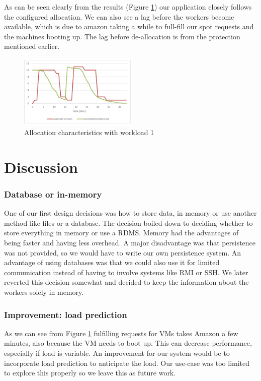 \documentclass[a4paper]{IEEEtran}
\begin{document}
As can be seen clearly from the results (Figure \ref{fig_allperfresults}) our application closely follows the configured allocation. We can also see a lag before the workers become available, which is due to amazon taking a while to full-fill our spot requests and the machines booting up. The lag before de-allocation is from the protection mentioned earlier.

\begin{figure}
\centering
\includegraphics[width=0.5\textwidth]{"results-allocation-2"}
\caption{Allocation characteristics with workload 1}
\label{fig_allperfresults}
\end{figure}
 
\newpage
\section{Discussion}


\subsubsection*{Database or in-memory}

One of our first design decisions was how to store data, in memory or use another method like files or a database. The decision boiled down to deciding whether to store everything in memory or use a RDMS. Memory had the advantages of being faster and having less overhead. A major disadvantage was that persistence was not provided, so we would have to write our own persistence system. An advantage of using databases was that we could also use it for limited communication instead of having to involve systems like RMI or SSH. We later reverted this decision somewhat and decided to keep the information about the workers solely in memory.

\subsubsection*{Improvement: load prediction}

As we can see from Figure \ref{fig_allperfresults} fulfilling requests for VMs takes Amazon a few minutes, also because the VM needs to boot up. This can decrease performance, especially if load is variable. An improvement for our system would be to incorporate load prediction to anticipate the load. Our use-case was too limited to explore this properly so we leave this as future work.
\end{document}
